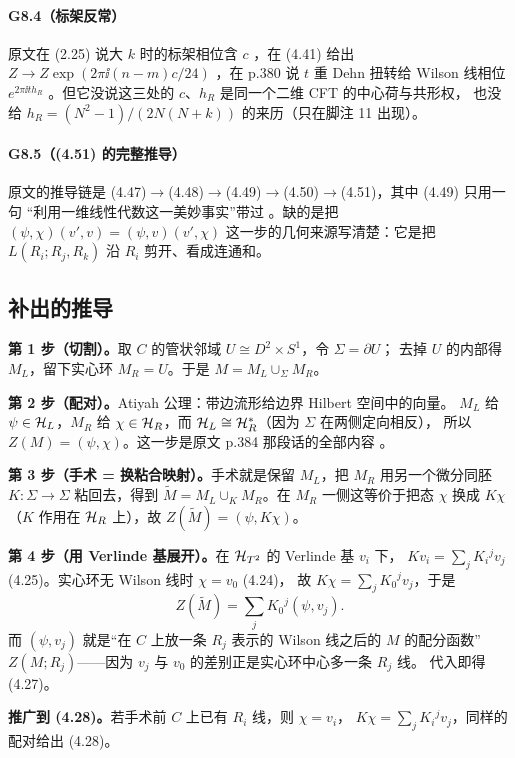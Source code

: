 \paragraph{G8.4（标架反常）}
原文在 (2.25) 说大 $k$ 时的标架相位含 $c$ ，在 (4.41) 给出
$Z\to Z\exp(2\pi\ii(n-m)c/24)$ ，在 p.380 说 $t$ 重 Dehn 扭转给 Wilson 线相位
$e^{2\pi\ii t h_R}$ 。但它没说这三处的 $c$、$h_R$ 是同一个二维 CFT 的中心荷与共形权，
也没给 $h_R=(N^2-1)/(2N(N+k))$ 的来历（只在脚注 11 出现）。

\paragraph{G8.5（(4.51) 的完整推导）}
原文的推导链是 (4.47)$\to$(4.48)$\to$(4.49)$\to$(4.50)$\to$(4.51)，其中 (4.49) 只用一句
“利用一维线性代数这一美妙事实”带过 。缺的是把 $(\psi,\chi)(v',v)=(\psi,v)(v',\chi)$
这一步的几何来源写清楚：它是把 $L(R_i;R_j,R_k)$ 沿 $R_i$ 剪开、看成连通和。

\subsection{补出的推导}

\begin{derivation}
\textbf{第 1 步（切割）。}取 $C$ 的管状邻域 $U\cong D^2\times S^1$，令 $\Sigma=\partial U$；
去掉 $U$ 的内部得 $M_L$，留下实心环 $M_R=U$。于是 $M=M_L\cup_\Sigma M_R$。

\textbf{第 2 步（配对）。}Atiyah 公理：带边流形给边界 Hilbert 空间中的向量。
$M_L$ 给 $\psi\in\mathcal{H}_L$，$M_R$ 给 $\chi\in\mathcal{H}_R$，而 $\mathcal{H}_L\cong\mathcal{H}_R^*$（因为 $\Sigma$ 在两侧定向相反），
所以 $Z(M)=(\psi,\chi)$。这一步是原文 p.384 那段话的全部内容 。

\textbf{第 3 步（手术 = 换粘合映射）。}手术就是保留 $M_L$，把 $M_R$ 用另一个微分同胚
$K:\Sigma\to\Sigma$ 粘回去，得到 $\tilde M=M_L\cup_{K}M_R$。在 $M_R$ 一侧这等价于把态
$\chi$ 换成 $K\chi$（$K$ 作用在 $\mathcal{H}_R$ 上），故 $Z(\tilde M)=(\psi,K\chi)$。

\textbf{第 4 步（用 Verlinde 基展开）。}在 $\mathcal{H}_{T^2}$ 的 Verlinde 基 $v_i$ 下，
$K v_i=\sum_jK_i{}^jv_j$ (4.25)。实心环无 Wilson 线时 $\chi=v_0$ (4.24)，
故 $K\chi=\sum_jK_0{}^jv_j$，于是
\[
Z(\tilde M)=\sum_jK_0{}^j(\psi,v_j).
\]
而 $(\psi,v_j)$ 就是“在 $C$ 上放一条 $R_j$ 表示的 Wilson 线之后的 $M$ 的配分函数”
$Z(M;R_j)$——因为 $v_j$ 与 $v_0$ 的差别正是实心环中心多一条 $R_j$ 线。
代入即得 (4.27)。

\textbf{推广到 (4.28)。}若手术前 $C$ 上已有 $R_i$ 线，则 $\chi=v_i$，
$K\chi=\sum_jK_i{}^jv_j$，同样的配对给出 (4.28)。\ours
\end{derivation}

